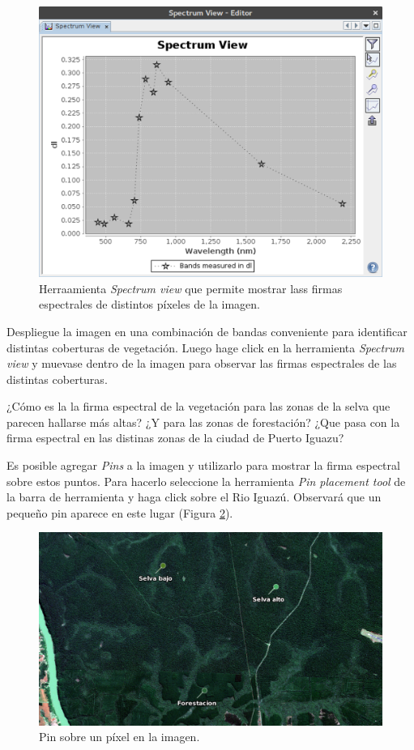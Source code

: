\documentclass[a4paper,10pt]{book}
\begin{document}
\begin{figure}[h!]
    \centering
    \includegraphics[scale=0.7]{fig:sps.png}
    \caption{Herraamienta \emph{Spectrum view} que permite mostrar lass firmas espectrales de distintos píxeles de la imagen.}
    \label{fig:sps}
\end{figure}

Despliegue la imagen  en una combinación de bandas conveniente para identificar distintas coberturas de vegetación. Luego hage click en la herramienta \emph{Spectrum view} y muevase dentro de la imagen para observar las firmas espectrales de las distintas coberturas.

\begin{que}
    ¿Cómo es la la firma espectral de la vegetación para las zonas de la selva que parecen hallarse más altas? ¿Y para las zonas de forestación? ¿Que pasa con la firma espectral en las distinas zonas de la ciudad de Puerto Iguazu?
\end{que}

Es posible agregar \emph{Pins} a la imagen y utilizarlo para mostrar la firma espectral sobre estos puntos. Para hacerlo seleccione la herramienta \emph{Pin placement tool} de la barra de herramienta y haga click sobre el Rio Iguazú. Observará que un pequeño pin aparece en este lugar (Figura \ref{fig:pin}).

\begin{figure}[h!]
    \centering
    \includegraphics[scale=0.7]{fig:pin.png}
    \caption{Pin sobre un píxel en la imagen.}
    \label{fig:pin}
\end{figure}
\end{document}
